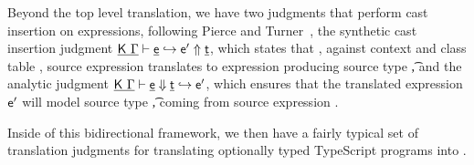 \documentclass[a4paper,USenglish]{tex/lipics-v2016}
\begin{document}
\begin{mathpar}



\end{mathpar}

Beyond the top level translation, we have two judgments that perform cast 
insertion on expressions, following Pierce and Turner~\cite{pierce:1998:local},
the synthetic cast insertion judgment $\GenCast\K\Env\e\ep\t$, which states that
, against context \Env and class table \K, source expression \e translates to
\kafka expression \ep producing source type \t, and the analytic judgment
$\AnaCast\K\Env\e\ep\t$, which ensures that the translated \kafka expression 
$\ep$ will model source type \t, coming from source expression \e.

Inside of this bidirectional framework, we then have a fairly typical set of
translation judgments for translating optionally typed TypeScript programs into
\kafka.

\begin{mathpar}




\end{mathpar}
\end{document}
